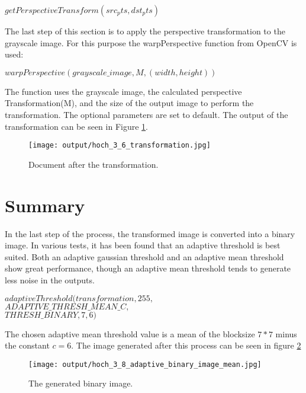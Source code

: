 \documentclass[twocolumn,10pt]{asme2ej}
\begin{document}
\begin{center}
    $getPerspectiveTransform(src_pts, dst_pts)$
\end{center}
The last step of this section is to apply the perspective transformation to the grayscale image. 
For this purpose the warpPerspective function\cite{opencv_warpPerspective} from OpenCV is used:
\begin{center}
    $warpPerspective(grayscale\_image, M, (width, height))$
\end{center}
The function uses the grayscale image, the calculated perspective Transformation(M), and the size of the 
output image to perform the transformation. The optional parameters are set to default.
The output of the transformation can be seen in Figure \ref{fig:transformation}.

\begin{figure}[H]
    \centerline{\texttt{[image: output/hoch\_3\_6\_transformation.jpg]}}
    \caption{Document after the transformation.}
    \label{fig:transformation}
\end{figure}




\section{Summary}
\noindent
In the last step of the process, the transformed image is converted into a binary image.
In various tests, it has been found that an adaptive threshold\cite{opencv_adaptivethreshold} is best suited.
Both an adaptive gaussian threshold\cite{opencv_adaptivetypes} and an adaptive mean threshold show great performance, 
though an adaptive mean threshold tends to generate less noise in the outputs.

\begin{center}
    \noindent
    $adaptiveThreshold(transformation,255,$\\
    $ADAPTIVE\_THRESH\_MEAN\_C, $\\
    $THRESH\_BINARY,7,6)$
\end{center}
\noindent
 \noindent
The chosen adaptive mean threshold value is a mean of the blocksize $7*7$ minus the constant $c=6$.
The image generated after this process can be seen in figure \ref{fig:binary}

\begin{figure}[H]
    \centerline{\texttt{[image: output/hoch\_3\_8\_adaptive\_binary\_image\_mean.jpg]}}
    \caption{The generated binary image.}
    \label{fig:binary}
\end{figure}
\end{document}

